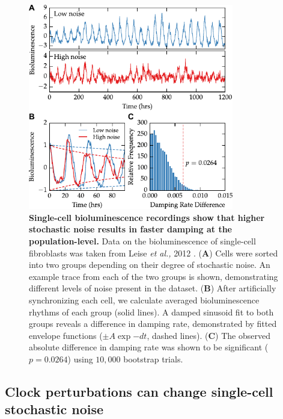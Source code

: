 \documentclass[11pt, letterpaper]{article}
\begin{document}
\begin{figure}[tbp]
  \begin{center}
    \includegraphics[width=0.8\textwidth]{figures/pdfs/noise_ts_and_boot.pdf}
  \end{center}
  \caption{{\bfseries Single-cell bioluminescence recordings show that higher stochastic noise results in faster damping at the population-level.}
  Data on the bioluminescence of single-cell fibroblasts was taken from Leise {\itshape et al.,} 2012 \cite{Leise2012}.
({\bfseries A}) Cells were sorted into two groups depending on their degree of stochastic noise. An example trace from each of the two groups is shown, demonstrating different levels of noise present in the dataset.
({\bfseries B}) After artificially synchronizing each cell, we calculate averaged bioluminescence rhythms of each group (solid lines). A damped sinusoid fit to both groups reveals a difference in damping rate, demonstrated by fitted envelope functions ($\pm A\exp{-dt}$, dashed lines).
({\bfseries C}) The observed absolute difference in damping rate was shown to be significant ($p = 0.0264$) using $10,000$ bootstrap trials.}
\label{fig:fibroblast_noise}
\end{figure}


\subsection*{Clock perturbations can change single-cell stochastic noise}

\end{document}
